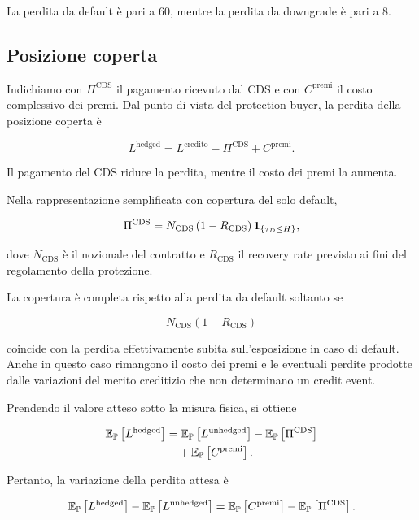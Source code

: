 La perdita da default \`{e} pari a $60$, mentre la perdita da downgrade
\`{e} pari a $8$.

\subsection{Posizione coperta}

\label{subsec:cap9-posizione-coperta}

Indichiamo con $\Pi^{\mathrm{CDS}}$ il pagamento ricevuto dal CDS e con
$C^{\mathrm{premi}}$ il costo complessivo dei premi. Dal punto di vista
del protection buyer, la perdita della posizione coperta \`{e}

\[
L^{\mathrm{hedged}}
=
L^{\mathrm{credito}}
-
\Pi^{\mathrm{CDS}}
+
C^{\mathrm{premi}}.
\]

Il pagamento del CDS riduce la perdita, mentre il costo dei premi la
aumenta.

Nella rappresentazione semplificata con copertura del solo default,

\[
\Pi^{\mathrm{CDS}}
=
N_{\mathrm{CDS}}
\left(
1-R_{\mathrm{CDS}}
\right)
\mathbf{1}_{\{\tau_D\leq H\}},
\]

dove $N_{\mathrm{CDS}}$ \`{e} il nozionale del contratto e
$R_{\mathrm{CDS}}$ il recovery rate previsto ai fini del regolamento
della protezione.

La copertura \`{e} completa rispetto alla perdita da default soltanto
se

\[
N_{\mathrm{CDS}}
\left(
1-R_{\mathrm{CDS}}
\right)
\]

coincide con la perdita effettivamente subita sull'esposizione in caso
di default. Anche in questo caso rimangono il costo dei premi e le
eventuali perdite prodotte dalle variazioni del merito creditizio che
non determinano un credit event.

Prendendo il valore atteso sotto la misura fisica, si ottiene

\[
\begin{split}
\mathbb{E}_{\mathbb{P}}
\left[
L^{\mathrm{hedged}}
\right]
&=
\mathbb{E}_{\mathbb{P}}
\left[
L^{\mathrm{unhedged}}
\right]
-
\mathbb{E}_{\mathbb{P}}
\left[
\Pi^{\mathrm{CDS}}
\right]
\\
&\quad
+
\mathbb{E}_{\mathbb{P}}
\left[
C^{\mathrm{premi}}
\right].
\end{split}
\]

Pertanto, la variazione della perdita attesa \`{e}

\[
\mathbb{E}_{\mathbb{P}}
\left[
L^{\mathrm{hedged}}
\right]
-
\mathbb{E}_{\mathbb{P}}
\left[
L^{\mathrm{unhedged}}
\right]
=
\mathbb{E}_{\mathbb{P}}
\left[
C^{\mathrm{premi}}
\right]
-
\mathbb{E}_{\mathbb{P}}
\left[
\Pi^{\mathrm{CDS}}
\right].
\]

